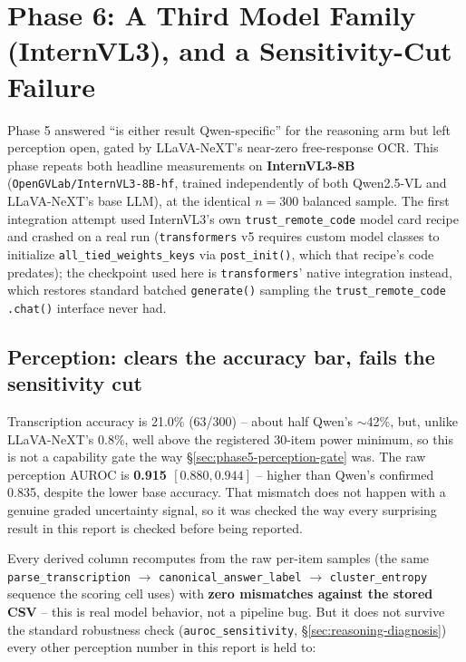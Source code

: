 \documentclass[11pt]{article}
\begin{document}
\section{Phase 6: A Third Model Family (InternVL3), and a Sensitivity-Cut
Failure}
\label{sec:phase6}

Phase 5 answered ``is either result Qwen-specific'' for the reasoning arm
but left perception open, gated by LLaVA-NeXT's near-zero free-response
OCR. This phase repeats both headline measurements on \textbf{InternVL3-8B}
(\texttt{OpenGVLab/InternVL3-8B-hf}, trained independently of both Qwen2.5-VL
and LLaVA-NeXT's base LLM), at the identical $n=300$ balanced sample. The
first integration attempt used InternVL3's own \texttt{trust\_remote\_code}
model card recipe and crashed on a real run (\texttt{transformers} v5
requires custom model classes to initialize \texttt{all\_tied\_weights\_keys}
via \texttt{post\_init()}, which that recipe's code predates); the
checkpoint used here is \texttt{transformers}' native integration instead,
which restores standard batched \texttt{generate()} sampling the
\texttt{trust\_remote\_code} \texttt{.chat()} interface never had.

\subsection{Perception: clears the accuracy bar, fails the sensitivity cut}
\label{sec:phase6-perception}

Transcription accuracy is 21.0\% (63/300) -- about half Qwen's
$\sim$42\%, but, unlike LLaVA-NeXT's 0.8\%, well above the registered
30-item power minimum, so this is not a capability gate the way
\S\ref{sec:phase5-perception-gate} was. The raw perception AUROC is
\textbf{0.915 $[0.880, 0.944]$} -- higher than Qwen's confirmed 0.835,
despite the lower base accuracy. That mismatch does not happen with a
genuine graded uncertainty signal, so it was checked the way every
surprising result in this report is checked before being reported.

Every derived column recomputes from the raw per-item samples (the same
\texttt{parse\_transcription} $\to$ \texttt{canonical\_answer\_label} $\to$
\texttt{cluster\_entropy} sequence the scoring cell uses) with \textbf{zero
mismatches against the stored CSV} -- this is real model behavior, not a
pipeline bug. But it does not survive the standard robustness check
(\texttt{auroc\_sensitivity}, \S\ref{sec:reasoning-diagnosis}) every other
perception number in this report is held to:
\end{document}
